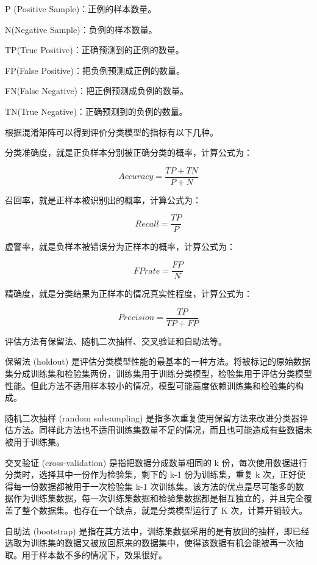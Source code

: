 P (Positive Sample)：正例的样本数量。

N(Negative Sample)：负例的样本数量。

TP(True Positive)：正确预测到的正例的数量。

FP(False Positive)：把负例预测成正例的数量。

FN(False Negative)：把正例预测成负例的数量。

TN(True Negative)：正确预测到的负例的数量。

根据混淆矩阵可以得到评价分类模型的指标有以下几种。

分类准确度，就是正负样本分别被正确分类的概率，计算公式为：

\begin{equation}
Accuracy=\frac{TP+TN}{P+N}
\end{equation}

召回率，就是正样本被识别出的概率，计算公式为：

\begin{equation}
Recall=\frac{TP}{P}
\end{equation}

虚警率，就是负样本被错误分为正样本的概率，计算公式为：

\begin{equation}
FPrate=\frac{FP}{N}
\end{equation}

精确度，就是分类结果为正样本的情况真实性程度，计算公式为：

\begin{equation}
Precision=\frac{TP}{TP+FP}
\end{equation}

评估方法有保留法、随机二次抽样、交叉验证和自助法等。

保留法 (holdout) 是评估分类模型性能的最基本的一种方法。将被标记的原始数据集分成训练集和检验集两份，训练集用于训练分类模型，检验集用于评估分类模型性能。但此方法不适用样本较小的情况，模型可能高度依赖训练集和检验集的构成。

随机二次抽样 (random subsampling) 是指多次重复使用保留方法来改进分类器评估方法。同样此方法也不适用训练集数量不足的情况，而且也可能造成有些数据未被用于训练集。

交叉验证 (cross-validation) 是指把数据分成数量相同的 k 份，每次使用数据进行分类时，选择其中一份作为检验集，剩下的 k-1 份为训练集，重复 k 次，正好使得每一份数据都被用于一次检验集 k-1 次训练集。该方法的优点是尽可能多的数据作为训练集数据，每一次训练集数据和检验集数据都是相互独立的，并且完全覆盖了整个数据集。也存在一个缺点，就是分类模型运行了 K 次，计算开销较大。

自助法 (bootstrap) 是指在其方法中，训练集数据采用的是有放回的抽样，即已经选取为训练集的数据又被放回原来的数据集中，使得该数据有机会能被再一次抽取。用于样本数不多的情况下，效果很好。
\appendix